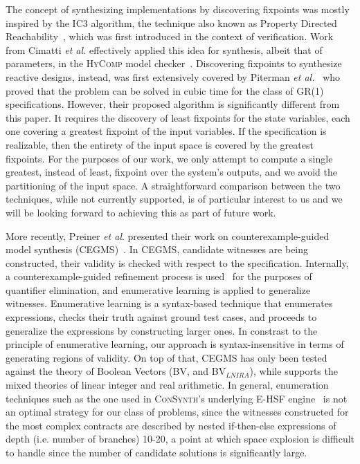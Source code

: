 The concept of synthesizing implementations by discovering fixpoints was mostly
inspired by the IC3 algorithm, the technique also known as Property Directed
Reachability~\cite{bradley2011sat,een2011efficient}, which was first introduced
in the context of verification. Work from Cimatti \textit{et al.} effectively
applied this idea for synthesis, albeit that of parameters, in the
\textsc{HyComp} model checker~\cite{DBLP:conf/fmcad/CimattiGMT13, cimatti2015hycomp}.
Discovering fixpoints to synthesize reactive designs, instead, was first
extensively covered by Piterman \textit{et al.}~\cite{piterman2006synthesis}
who proved that the problem can be solved in cubic time for the class of GR(1) specifications.
However, their proposed algorithm is significantly different from this paper. It
requires the discovery of least fixpoints for the state variables,
each one covering a greatest fixpoint of the input variables. If the specification
is realizable, then the entirety of the input space is covered by the greatest fixpoints. For the purposes of our work, we only attempt to compute a single greatest, instead of least, fixpoint over the system's outputs, and we avoid the partitioning of the input space. A straightforward comparison between the two techniques, while not currently
supported, is of particular interest to us and we will be looking forward to
achieving this as part of future work.

More recently, Preiner \textit{et al}. presented their work on counterexample-guided model synthesis (CEGMS)~\cite{preiner2017counterexample}. In CEGMS, candidate witnesses are being constructed, their validity is checked with respect to the specification. Internally, a counterexample-guided refinement process is used~\cite{reynolds2015counterexample} for the purposes of quantifier
elimination, and enumerative learning is applied to generalize witnesses. Enumerative learning is a syntax-based technique that enumerates expressions, checks their truth against
ground test cases, and proceeds to generalize the expressions by constructing larger ones. In constrast to the principle of enumerative learning, our approach is syntax-insensitive in terms of generating regions of validity.
On top of that, CEGMS has only been tested against the theory of Boolean Vectors (BV, and BV$_{LNIRA}$), while \jsynvg supports the mixed theories of linear integer and real arithmetic.
In general, enumeration techniques such as the one used in \textsc{ConSynth}'s underlying E-HSF engine~\cite{beyene2014constraint} is not an optimal strategy for our class of problems, since the witnesses constructed for the most complex contracts are described by nested if-then-else expressions of depth (i.e. number of branches) 10-20, a point at which space explosion is difficult to handle since the number of candidate solutions is significantly large.

